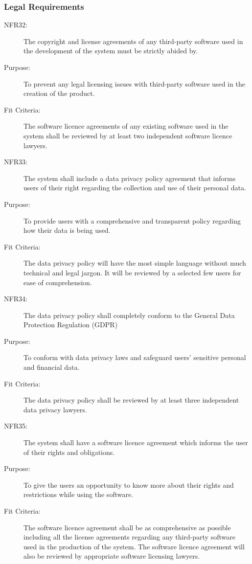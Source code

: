 \documentclass[a4paper,twoside,phd]{BYUPhys}
\begin{document}
\subsubsection{Legal Requirements}
\begin{description}
\item[NFR32:] The copyright and license agreements of any third-party software used in the development of the system must be strictly abided by.
\item[Purpose:] To prevent any legal licensing issues with third-party software used in the creation of the product.
\item[Fit Criteria:] The software licence agreements of any existing software used in the system shall be reviewed by at least two independent software licence lawyers.
\item[NFR33:] The system shall include a data privacy policy agreement that informs users of their right regarding the collection and use of their personal data.
\item[Purpose:] To provide users with a comprehensive and transparent policy regarding how their data is being used.
\item[Fit Criteria:] The data privacy policy will have the most simple language without much technical and legal jargon. It will be reviewed by a selected few users for ease of comprehension.
\item[NFR34:] The data privacy policy shall completely conform to the General Data Protection Regulation (GDPR)
\item[Purpose:] To conform with data privacy laws and safeguard users' sensitive personal and financial data.
\item[Fit Criteria:] The data privacy policy shall be reviewed by at least three independent data privacy lawyers. 
\item[NFR35:] The system shall have a software licence agreement which informs the user of their rights and obligations.
\item[Purpose:] To give the users an opportunity to know more about their rights and restrictions while using the software.
\item[Fit Criteria:] The software licence agreement shall be as comprehensive as possible including all the license agreements regarding any third-party software used in the production of the system. The software licence agreement will also be reviewed by appropriate software licensing lawyers.
\end{description}
\end{document}
